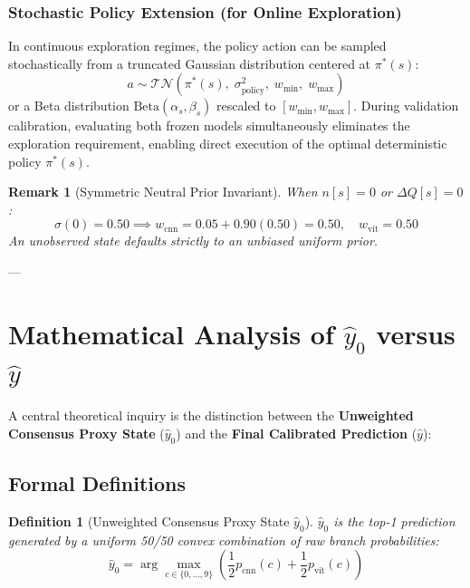 \documentclass[10pt,journal,compsoc]{IEEEtran}
\newtheorem{definition}{Definition}
\newtheorem{remark}{Remark}
\begin{document}
\subsubsection{Stochastic Policy Extension (for Online Exploration)}
In continuous exploration regimes, the policy action can be sampled stochastically from a truncated Gaussian distribution centered at $\pi^*(s)$:
\begin{equation}
a \sim \mathcal{TN}\left(\pi^*(s), \; \sigma_{\text{policy}}^2, \; w_{\min}, \; w_{\max}\right)
\end{equation}
or a Beta distribution $\text{Beta}(\alpha_s, \beta_s)$ rescaled to $[w_{\min}, w_{\max}]$. During validation calibration, evaluating both frozen models simultaneously eliminates the exploration requirement, enabling direct execution of the optimal deterministic policy $\pi^*(s)$.

\begin{remark}[Symmetric Neutral Prior Invariant]
When $n[s] = 0$ or $\Delta Q[s] = 0$:
\begin{equation}
\sigma(0) = 0.50 \implies w_{\text{cnn}} = 0.05 + 0.90(0.50) = \mathbf{0.50}, \quad w_{\text{vit}} = \mathbf{0.50}
\end{equation}
An unobserved state defaults strictly to an unbiased uniform prior.
\end{remark}

---

\section{Mathematical Analysis of $\hat{y}_0$ versus $\hat{y}$}

A central theoretical inquiry is the distinction between the \textbf{Unweighted Consensus Proxy State} ($\hat{y}_0$) and the \textbf{Final Calibrated Prediction} ($\hat{y}$):

\subsection{Formal Definitions}
\begin{definition}[Unweighted Consensus Proxy State $\hat{y}_0$]
$\hat{y}_0$ is the top-1 prediction generated by a uniform 50/50 convex combination of raw branch probabilities:
\begin{equation}
\hat{y}_0 = \arg\max_{c \in \{0, \dots, 9\}} \left( \frac{1}{2} p_{\text{cnn}}(c) + \frac{1}{2} p_{\text{vit}}(c) \right)
\end{equation}
\end{definition}
\end{document}
